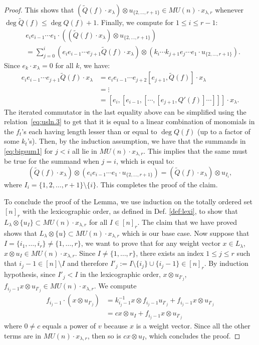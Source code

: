 \documentclass{amsart}
\numberwithin{equation}{section}
\theoremstyle{theorem}
\theoremstyle{definition}
\newcommand{\sm}{\setminus}
\begin{document}
\begin{proof}
This shows that $(\widetilde Q(f)\cdot x_{\lambda})\otimes u_{\{2,\ldots,r+1\}} \in MU(n)\cdot x_{\lambda,r}$ whenever $\deg\widetilde Q(f)\leq\deg Q(f)+1$.
Finally, we compute for $1\leq i\leq r-1$:
\begin{align}
&e_i e_{i-1}\cdots e_1 \cdot ((\widetilde Q(f)\cdot x_{\lambda})\otimes u_{\{2,\ldots,r+1\}})\\
&= \sum_{j=0}^{i}(e_i e_{i-1}\cdots e_{j+1}\widetilde Q(f)\cdot x_{\lambda})\otimes (k_i\cdots k_{j+1} e_{j}\cdots e_1\cdot u_{\{2,\ldots,r+1\}}). \label{eq:bigsum1}
\end{align}
Since $e_k\cdot x_{\lambda}=0$ for all $k$, we have:
\begin{align*}
e_ie_{i-1}\cdots e_{j+1}\widetilde Q(f)\cdot x_{\lambda}
&=e_ie_{i-1}\cdots e_{j+2}[e_{j+1},\widetilde Q(f)]\cdot x_{\lambda}\\
&=\vdots\\
&=[e_i,[e_{i-1},[\cdots,[e_{j+1},Q'(f)]\cdots]]]\cdot x_{\lambda}.
\end{align*}
The iterated commutator in the last equality above can be simplified using the relation~\eqref{eq:usln.3}  to get that it is equal to a linear combination of monomials in the $f_t$'s each having length lesser than or equal to $\deg Q(f)$ (up to a factor of some $k_t$'s). Then, by the induction assumption, we have that the summands in \eqref{eq:bigsum1} for $j<i$ all lie in $MU(n)\cdot x_{\lambda,r}$.
This implies that the same must be true for the summand when $j=i$, which is equal to:
\[(\widetilde Q(f)\cdot x_{\lambda})\otimes (e_{i} e_{i-1}\cdots e_1\cdot u_{\{2,\ldots,r+1\}})=(\widetilde Q(f)\cdot x_{\lambda})\otimes u_{I_i},\]
where $I_i=\{1,2,\dots, r+1\}\sm\{i\}$. This completes the proof of the claim.

To conclude the proof of the Lemma, we use induction on the totally ordered set $[n]_r$ with the lexicographic order, as defined in Def. \ref{def:lexi}, to show that $L_\lambda\otimes \{u_I\}\subset MU(n)\cdot x_{\lambda,r}$ for all $I\in[n]_r$. The claim that we have proved shows that $L_\lambda\otimes \{u\}\subset MU(n)\cdot x_{\lambda,r}$ which is our base case. Now suppose that $I=\{i_1,\ldots,i_r\}\neq\{1,\ldots,r\}$, we want to prove that for any weight vector $x\in L_\lambda$, $x\otimes u_I\in MU(n)\cdot x_{\lambda,r}$. Since $I\neq\{1,\ldots,r\}$, there exists an index $1\leq j\leq r$ such that $i_j-1\in [n]\setminus I$ and therefore $I'_j:=I\setminus\{i_j\}\cup\{i_j-1\}\in[n]_r$. By induction hypothesis, since $I'_j<I$ in the lexicographic order, $x\otimes u_{I'_j}$, $f_{i_j-1}x\otimes u_{I'_j}\in MU(n)\cdot x_{\lambda,r}$. We compute
\begin{align*}f_{i_j-1}\cdot\left(x\otimes u_{I'_j}\right)&=k_{i_j-1}^{-1}x\otimes f_{i_j-1}u_{I'_j}+f_{i_j-1}x\otimes u_{I'_j}\\
&=cx\otimes u_I+f_{i_j-1}x\otimes u_{I'_j}\end{align*}
where $0\neq c$ equals a power of $v$ because $x$ is a weight vector. Since all the other terms are in $MU(n)\cdot x_{\lambda,r}$, then so is $cx\otimes u_I$, which concludes the proof.
\end{proof}
\end{document}
